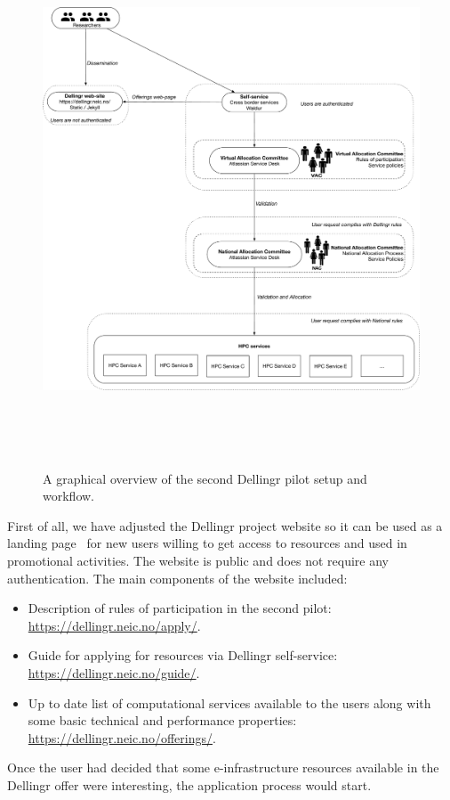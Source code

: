 \documentclass{article}
\newcommand{\dell}{Dellingr\xspace}
\newcommand{\einfra}{e-infrastructure\xspace}
\begin{document}
\begin{figure}
\centering
\includegraphics[height=450pt]{diagram.pdf}
\caption{A graphical overview of the second \dell pilot setup and workflow.}
\label{fig:workflow}
\end{figure}

First of all, we have adjusted the \dell project website so it can be used as a landing page~\cite{dellingr-landing} for new users willing to get access to resources and used in promotional activities. 
The website is public and does not require any authentication.
The main components of the website included:
\begin{itemize}
    \item Description of rules of participation in the second pilot: \url{https://dellingr.neic.no/apply/}.
    \item Guide for applying for resources via \dell self-service: \url{https://dellingr.neic.no/guide/}.
    \item Up to date list of computational services available to the users along with some basic technical and performance properties: \url{https://dellingr.neic.no/offerings/}.
\end{itemize}
Once the user had decided that some \einfra resources available in the \dell offer were interesting, the application process would start. 
\end{document}
